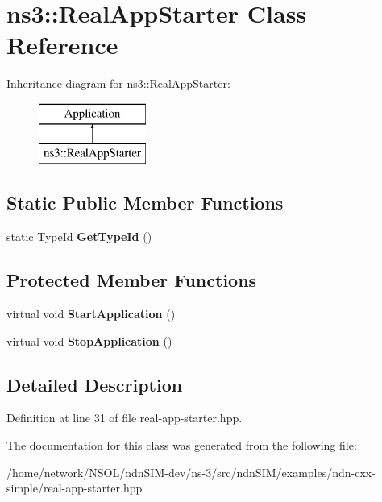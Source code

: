 \hypertarget{classns3_1_1RealAppStarter}{}\section{ns3\+:\+:Real\+App\+Starter Class Reference}
\label{classns3_1_1RealAppStarter}
Inheritance diagram for ns3\+:\+:Real\+App\+Starter\+:\begin{figure}[H]
\begin{center}
\leavevmode
\includegraphics[height=2.000000cm]{classns3_1_1RealAppStarter}
\end{center}
\end{figure}
\subsection*{Static Public Member Functions}
\begin{DoxyCompactItemize}
\item 
static Type\+Id {\bfseries Get\+Type\+Id} ()\hypertarget{classns3_1_1RealAppStarter_aab3ab1de4568d3a7f51d83cf4844dc62}{}\label{classns3_1_1RealAppStarter_aab3ab1de4568d3a7f51d83cf4844dc62}

\end{DoxyCompactItemize}
\subsection*{Protected Member Functions}
\begin{DoxyCompactItemize}
\item 
virtual void {\bfseries Start\+Application} ()\hypertarget{classns3_1_1RealAppStarter_a1fa12df2779b589a4c12dff3084691c6}{}\label{classns3_1_1RealAppStarter_a1fa12df2779b589a4c12dff3084691c6}

\item 
virtual void {\bfseries Stop\+Application} ()\hypertarget{classns3_1_1RealAppStarter_a426716b2a31301dc9cf4d93eeaf6855b}{}\label{classns3_1_1RealAppStarter_a426716b2a31301dc9cf4d93eeaf6855b}

\end{DoxyCompactItemize}


\subsection{Detailed Description}


Definition at line 31 of file real-\/app-\/starter.\+hpp.



The documentation for this class was generated from the following file\+:\begin{DoxyCompactItemize}
\item 
/home/network/\+N\+S\+O\+L/ndn\+S\+I\+M-\/dev/ns-\/3/src/ndn\+S\+I\+M/examples/ndn-\/cxx-\/simple/real-\/app-\/starter.\+hpp\end{DoxyCompactItemize}
